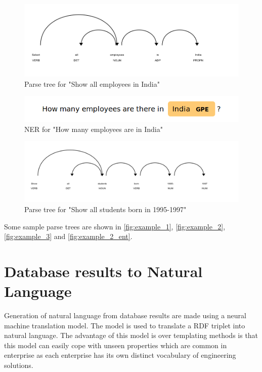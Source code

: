\documentclass[a4paper,12pt,oneside]{book}
\begin{document}
\begin{figure}
    \centering
    \includegraphics[width=\textwidth]{images/Select-all-employees-in-India.png}
    \caption{Parse tree for "Show all employees in India"}
    \label{fig:example_2}
\end{figure}

\begin{figure}
    \centering
    \includegraphics[width=\textwidth]{images/ent_recog.png}
    \caption{NER for "How many employees are in India"}
    \label{fig:example_2_ent}
\end{figure}

\begin{figure}
    \centering
    \includegraphics[width=\textwidth]{images/Show-all-students-born-1995-1997.png}
    \caption{Parse tree for "Show all students born in 1995-1997"}
    \label{fig:example_3}
\end{figure}


Some sample parse trees are shown in \autoref{fig:example_1}, \autoref{fig:example_2}, \autoref{fig:example_3} and \autoref{fig:example_2_ent}.

\section{Database results to Natural Language}

Generation of natural language\cite{popescu2003towards} from database results are made using a neural machine translation model\cite{luong2015effective}. The model is used to translate a RDF triplet into natural language. The advantage of this model is over templating methods is that this model can easily cope with unseen properties which are common in enterprise as each enterprise has its own distinct vocabulary of engineering solutions.
\end{document}
